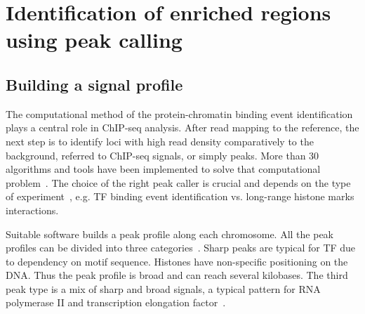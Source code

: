 \chapter{Identification of enriched regions using peak calling}

\section{Building a signal profile}

The computational method of the protein-chromatin binding event identification plays a central role in ChIP-seq analysis. 
After read mapping to the reference, the next step is to identify loci with high read density comparatively to the background, referred to ChIP-seq signals, or simply peaks.
More than 30 algorithms and tools have been implemented to solve that computational problem~\cite{chen2012systematic}.
The choice of the right peak caller is crucial and depends on the type of experiment~\cite{nakato2017recent}, e.g. TF binding event identification vs. long-range histone marks interactions.

Suitable software builds a peak profile along each chromosome. 
All the peak profiles can be divided into three categories~\cite{park2009chip}. 
Sharp peaks are typical for TF due to dependency on motif sequence. 
Histones have non-specific positioning on the DNA. 
Thus the peak profile is broad and can reach several kilobases. 
The third peak type is a mix of sharp and broad signals, a typical pattern for RNA polymerase II and transcription elongation factor~\cite{lin2011dynamic}.




